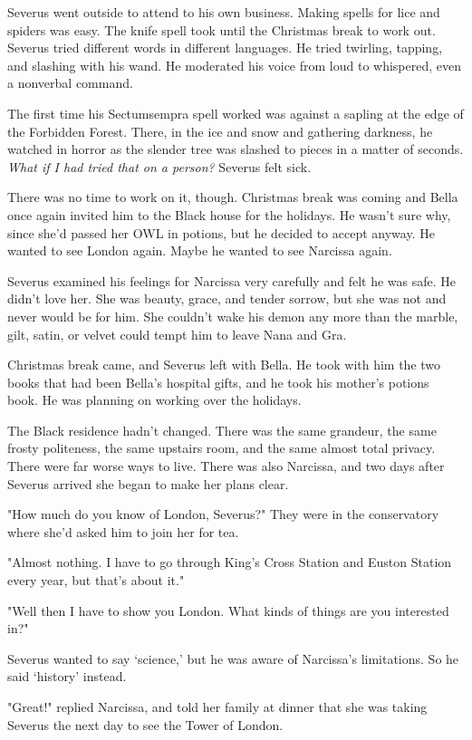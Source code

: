 \documentclass[a4paper,11pt]{article}
\begin{document}
Severus went outside to attend to his own business. Making spells for lice and spiders was easy. The knife spell took until the Christmas break to work out. Severus tried different words in different languages. He tried twirling, tapping, and slashing with his wand. He moderated his voice from loud to whispered, even a nonverbal command.

The first time his Sectumsempra spell worked was against a sapling at the edge of the Forbidden Forest. There, in the ice and snow and gathering darkness, he watched in horror as the slender tree was slashed to pieces in a matter of seconds. \emph{What if I had tried that on a person?} Severus felt sick.

There was no time to work on it, though. Christmas break was coming and Bella once again invited him to the Black house for the holidays. He wasn't sure why, since she'd passed her OWL in potions, but he decided to accept anyway. He wanted to see London again. Maybe he wanted to see Narcissa again.

Severus examined his feelings for Narcissa very carefully and felt he was safe. He didn't love her. She was beauty, grace, and tender sorrow, but she was not and never would be for him. She couldn't wake his demon any more than the marble, gilt, satin, or velvet could tempt him to leave Nana and Gra.

Christmas break came, and Severus left with Bella. He took with him the two books that had been Bella's hospital gifts, and he took his mother's potions book. He was planning on working over the holidays.

The Black residence hadn't changed. There was the same grandeur, the same frosty politeness, the same upstairs room, and the same almost total privacy. There were far worse ways to live. There was also Narcissa, and two days after Severus arrived she began to make her plans clear.

"How much do you know of London, Severus?" They were in the conservatory where she'd asked him to join her for tea.

"Almost nothing. I have to go through King's Cross Station and Euston Station every year, but that's about it."

"Well then I have to show you London. What kinds of things are you interested in?"

Severus wanted to say `science,' but he was aware of Narcissa's limitations. So he said `history' instead.

"Great!" replied Narcissa, and told her family at dinner that she was taking Severus the next day to see the Tower of London.
\end{document}

